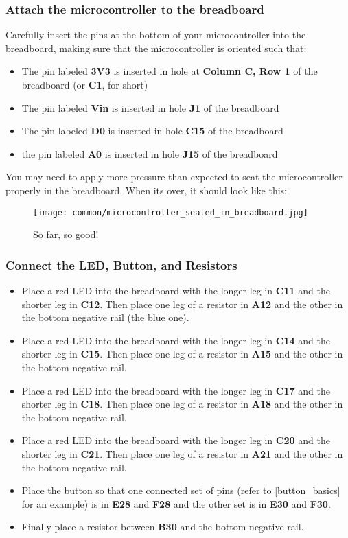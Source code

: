 \subsubsection{Attach the microcontroller to the breadboard}
Carefully insert the pins at the bottom of your microcontroller into the breadboard, making sure that the microcontroller is oriented such that:
\begin{itemize}
    \item The pin labeled \textbf{3V3} is inserted in hole at \textbf{Column C, Row 1} of the breadboard (or \textbf{C1}, for short)
    \item The pin labeled \textbf{Vin} is inserted in hole \textbf{J1} of the breadboard
    \item The pin labeled \textbf{D0} is inserted in hole \textbf{C15} of the breadboard
    \item the pin labeled \textbf{A0} is inserted in hole \textbf{J15} of the breadboard
\end{itemize}
You may need to apply more pressure than expected to seat the microcontroller properly in the breadboard. When its over, it should look like this:

\begin{figure}[H]
    \centering
    \texttt{[image: common/microcontroller\_seated\_in\_breadboard.jpg]}
    \caption{So far, so good!}
\end{figure}

\subsubsection{Connect the LED, Button, and Resistors}
\begin{itemize}
    \item Place a red LED into the breadboard with the longer leg in \textbf{C11} and the shorter leg
    in \textbf{C12}. Then place one leg of a resistor in \textbf{A12} and the other in the bottom
    negative rail (the blue one).
    \item Place a red LED into the breadboard with the longer leg in \textbf{C14} and the shorter leg
    in \textbf{C15}. Then place one leg of a resistor in \textbf{A15} and the other in the bottom
    negative rail.
    \item Place a red LED into the breadboard with the longer leg in \textbf{C17} and the shorter leg
    in \textbf{C18}. Then place one leg of a resistor in \textbf{A18} and the other in the bottom
    negative rail.
    \item Place a red LED into the breadboard with the longer leg in \textbf{C20} and the shorter leg
    in \textbf{C21}. Then place one leg of a resistor in \textbf{A21} and the other in the bottom
    negative rail.
    \item Place the button so that one connected set of pins (refer to \ref{button_basics} for an example) is in \textbf{E28}
    and \textbf{F28} and the other set is in \textbf{E30} and \textbf{F30}.
    \item Finally place a resistor between \textbf{B30} and the bottom negative rail.
\end{itemize}

